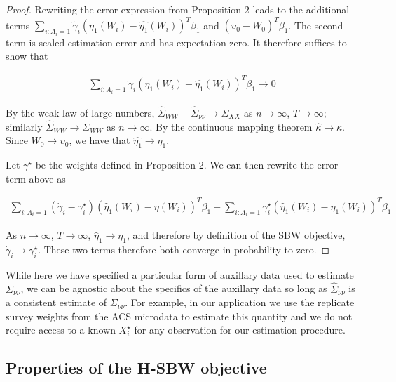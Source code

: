 \begin{proof}
Rewriting the error expression from Proposition 2 leads to the additional terms $\sum_{i: A_i = 1}\tilde{\gamma}_i(\eta_1(W_i) - \hat{\eta_1}(W_i))^T\beta_1$ and $(\upsilon_0 - \bar{W}_0)^T\beta_1$. The second term is scaled estimation error and has expectation zero. It therefore suffices to show that 

\begin{align*}
\sum_{i: A_i = 1}\tilde{\gamma}_i(\eta_1(W_i) - \hat{\eta_1}(W_i))^T\beta_1 \to 0
\end{align*}

By the weak law of large numbers, $\hat{\Sigma}_{WW} - \hat{\Sigma}_{\nu\nu} \to \Sigma_{XX}$ as $n \to \infty$, $T \to \infty$; similarly $\hat{\Sigma}_{WW} \to \Sigma_{WW}$ as $n \to \infty$. By the continuous mapping theorem $\hat{\kappa} \to \kappa$. Since $\bar{W}_0 \to \upsilon_0$, we have that $\hat{\eta_1} \to \eta_1$. 

Let $\gamma^\star$ be the weights defined in Proposition 2. We can then rewrite the error term above as

\begin{align*}
\sum_{i: A_i = 1}(\dot{\gamma}_i - \gamma_i^\star)(\hat{\eta}_1(W_i) - \eta(W_i))^T\beta_1 + \sum_{i: A_i = 1}\gamma_i^\star(\hat{\eta}_1(W_i) - \eta_1(W_i))^T\beta_1
\end{align*}

As $n \to \infty$, $T \to \infty$, $\hat{\eta}_1 \to \eta_1$, and therefore by definition of the SBW objective, $\dot{\gamma}_i \to \gamma_i^\star$. These two terms therefore both converge in probability to zero. 
\end{proof}

\begin{remark}
While here we have specified a particular form of auxillary data used to estimate $\Sigma_{\nu\nu}$, we can be agnostic about the specifics of the auxillary data so long as $\hat{\Sigma}_{\nu\nu}$ is a consistent estimate of $\Sigma_{\nu\nu}$. For example, in our application we use the replicate survey weights from the ACS microdata to estimate this quantity and we do not require access to a known $X_i^\star$ for any observation for our estimation procedure.
\end{remark}

\subsection{Properties of the H-SBW objective}\label{app:AsecII}

